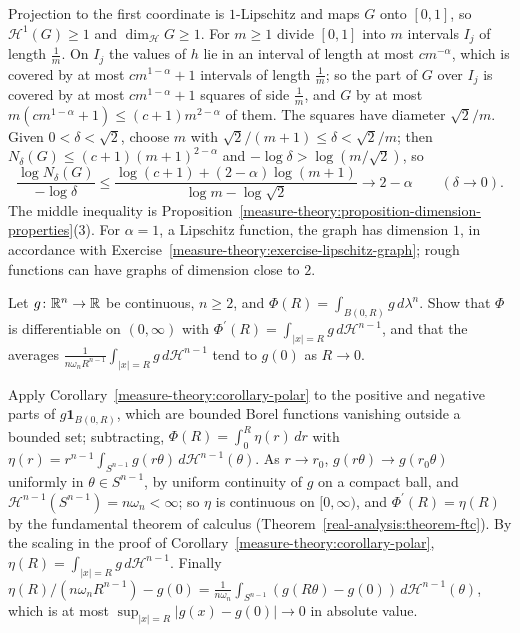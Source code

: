 \begin{solution}
Projection to the first coordinate is $1$-Lipschitz and maps $G$ onto $[0, 1]$, so $\mathcal{H}^1(G) \geq 1$ and $\dim_{\mathcal{H}}G \geq 1$. For $m \geq 1$ divide $[0, 1]$ into $m$ intervals $I_j$ of
length $\frac1m$. On $I_j$ the values of $h$ lie in an interval of length at most $cm^{-\alpha}$, which is covered by at most $cm^{1-\alpha} + 1$ intervals of length $\frac1m$; so the part of $G$ over
$I_j$ is covered by at most $cm^{1-\alpha} + 1$ squares of side $\frac1m$, and $G$ by at most $m(cm^{1-\alpha} + 1) \leq (c + 1)m^{2-\alpha}$ of them. The squares have diameter $\sqrt2/m$. Given
$0 < \delta < \sqrt2$, choose $m$ with $\sqrt2/(m + 1) \leq \delta < \sqrt2/m$; then $N_\delta(G) \leq (c + 1)(m + 1)^{2-\alpha}$ and $-\log\delta > \log(m/\sqrt2)$, so
\[
\frac{\log N_\delta(G)}{-\log\delta} \leq \frac{\log(c + 1) + (2 - \alpha)\log(m + 1)}{\log m - \log\sqrt2} \to 2 - \alpha \qquad (\delta \to 0).
\]
The middle inequality is Proposition~\ref{measure-theory:proposition-dimension-properties}(3). For $\alpha = 1$, a Lipschitz function, the graph has dimension $1$, in accordance with
Exercise~\ref{measure-theory:exercise-lipschitz-graph}; rough functions can have graphs of dimension close to $2$.
\end{solution}

\begin{exercise}\label{measure-theory:exercise-ball-derivative}
Let $g \colon \mathbb{R}^n \to \mathbb{R}$ be continuous, $n \geq 2$, and $\Phi(R) = \int_{B(0, R)}g\,d\lambda^n$. Show that $\Phi$ is differentiable on $(0, \infty)$ with
$\Phi^{\prime}(R) = \int_{|x| = R}g\,d\mathcal{H}^{n-1}$, and that the averages $\frac1{n\omega_nR^{n-1}}\int_{|x| = R}g\,d\mathcal{H}^{n-1}$ tend to $g(0)$ as $R \to 0$.
\end{exercise}

\begin{solution}
Apply Corollary~\ref{measure-theory:corollary-polar} to the positive and negative parts of $g\mathbf{1}_{B(0, R)}$, which are bounded Borel functions vanishing outside a bounded set; subtracting,
$\Phi(R) = \int_0^R\eta(r)\,dr$ with $\eta(r) = r^{n-1}\int_{S^{n-1}}g(r\theta)\,d\mathcal{H}^{n-1}(\theta)$. As $r \to r_0$, $g(r\theta) \to g(r_0\theta)$ uniformly in $\theta \in S^{n-1}$, by uniform
continuity of $g$ on a compact ball, and $\mathcal{H}^{n-1}(S^{n-1}) = n\omega_n < \infty$; so $\eta$ is continuous on $[0, \infty)$, and $\Phi^{\prime}(R) = \eta(R)$ by the fundamental theorem of calculus
(Theorem~\ref{real-analysis:theorem-ftc}). By the scaling in the proof of Corollary~\ref{measure-theory:corollary-polar}, $\eta(R) = \int_{|x| = R}g\,d\mathcal{H}^{n-1}$. Finally
$\eta(R)/(n\omega_nR^{n-1}) - g(0) = \frac{1}{n\omega_n}\int_{S^{n-1}}(g(R\theta) - g(0))\,d\mathcal{H}^{n-1}(\theta)$, which is at most $\sup_{|x| = R}|g(x) - g(0)| \to 0$ in absolute value.
\end{solution}

